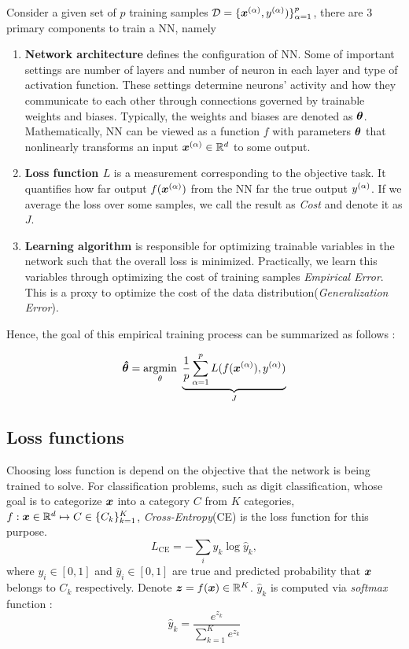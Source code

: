 Consider a given set of $p$ training samples $\mathcal{D} = \{ \xa, \ya) \}_{\alpha=1}^{p}$,  there are 3 primary components to train a NN, namely  
\begin{enumerate}
	\item \textbf{Network architecture} defines the configuration of NN. Some of important settings are number of layers and number of neuron in each layer and type of activation function. These settings determine neurons' activity and how they communicate to each other through connections governed by trainable weights and biases. Typically, the weights and biases are denoted as $\patvector{\theta}$. Mathematically, NN can be viewed as a function $f$ with parameters $\patvector{\theta}$ that nonlinearly transforms an input $\xa\in \mathbb{R}^d $ to some output.
	\item \textbf{Loss function $L$}  is a measurement corresponding to the objective task. It quantifies how far output $f(\xa)$ from the NN far the true output $y^{(\alpha)}$. If we average the loss over some samples,  we call the result as \textit{Cost} and denote it as $J$.
	\item \textbf{Learning algorithm} is responsible for optimizing trainable variables in the network such that the overall loss is minimized. Practically, we learn this variables through optimizing the cost of training samples \textit{Empirical Error}. This is a proxy to optimize the cost of the data distribution(\textit{Generalization Error}). 
\end{enumerate}

Hence, the goal of this empirical training process can be summarized as follows : 

\begin{align} \label{eq:nn_opt}
	\patvector{\hat{\theta}} = \patarg{min}{\theta} \underbrace{\frac{1}{p}  \sum_{\alpha=1}^p L( f(\xa), \ya) }_{J}
\end{align}

\subsection{Loss functions}
Choosing loss function is depend on the objective that the network is being trained to solve. For classification problems, such as digit classification, whose goal is to categorize $\boldsymbol{x}$ into a category $C$ from $K$ categories, $f : \boldsymbol{x} \in \mathbb{R}^d  \mapsto C \in \{ C_k \}_{k=1}^K$, \textit{Cross-Entropy}(CE) is the loss function for this purpose.
$$
L_{\text{CE}} = - \sum_{i} y_k \log \hat{y}_k,
$$
where $y_i \in [0, 1]$ and $\hat{y}_i \in [0, 1]$ are true and predicted probability that $\boldsymbol{x}$ belongs to $C_k$ respectively. Denote $\patvector{z} = f(\x) \in \mathbb{R}^{K}$. $\hat{y}_k$ is computed via \textit{softmax} function :
$$
\hat{y}_k = \frac{e^{z_k}}{ \sum_{k=1}^K{e^{z_k}} }
$$ 

